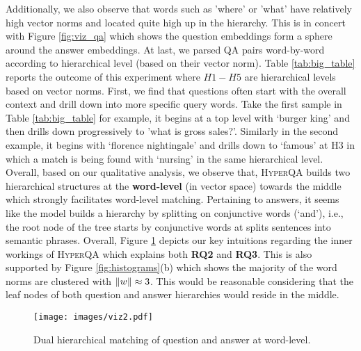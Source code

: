 \documentclass[sigconf]{acmart}
\DeclarePairedDelimiter\norm{\lVert}{\rVert}\fancyhead{}
\begin{document}
 Additionally, we also observe that words such as 'where' or 'what' have relatively high vector norms and located quite high up in the hierarchy. This is in concert with Figure \ref{fig:viz_qa} which shows the question embeddings form a sphere around the answer embeddings. At last, we parsed QA pairs word-by-word according to hierarchical level (based on their vector norm). Table \ref{tab:big_table} reports the outcome of this experiment where $H1-H5$ are hierarchical levels based on vector norms. First, we find that questions often start with the overall context and drill down into more specific query words. Take the first sample in Table \ref{tab:big_table} for example, it begins at a top level with `burger king' and then drills down progressively to 'what is gross sales?'. Similarly in the second example, it begins with `florence nightingale' and drills down to `famous' at H3 in which a match is being found with `nursing' in the same hierarchical level. Overall, based on our qualitative analysis, we observe that, \textsc{HyperQA} builds two hierarchical structures at the \textbf{word-level} (in vector space) towards the middle which strongly facilitates word-level matching. Pertaining to answers, it seems like the model builds a hierarchy by splitting on conjunctive words (`and'), i.e., the root node of the tree starts by conjunctive words at splits sentences into semantic phrases. Overall, Figure \ref{words_ex} depicts our key intuitions regarding the inner workings of \textsc{HyperQA} which explains both \textbf{RQ2} and \textbf{RQ3}. This is also supported by Figure \ref{fig:histograms}(b) which shows the majority of the word norms are clustered with $\norm{w} \approx 3$. This would be reasonable considering that the leaf nodes of both question and answer hierarchies would reside in the middle. 
\begin{figure}[H]
\begin{center}
\texttt{[image: images/viz2.pdf]}
\vspace{-1em}
\caption{Dual hierarchical matching of question and answer at word-level.}
\label{words_ex}
\end{center}
\end{figure}

\vspace{-1em}
\end{document}
